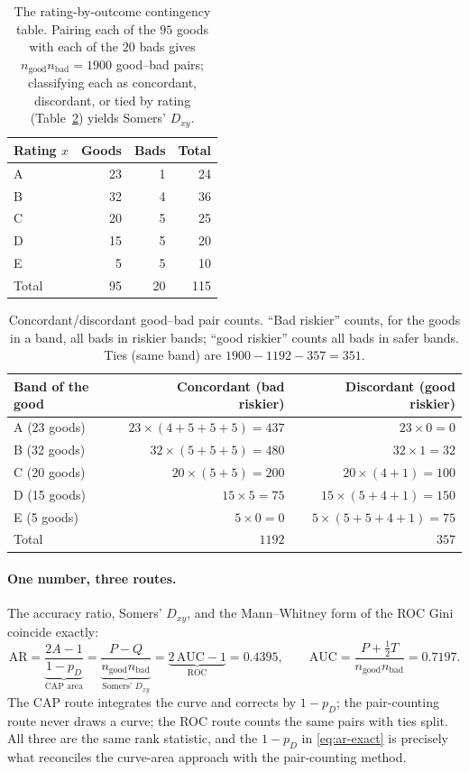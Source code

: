 \documentclass[12pt]{article}
\newcommand{\pD}{p_D}
\newcommand{\AR}{\mathrm{AR}}
\begin{document}
\begin{table}[htbp]
\centering
\small
\begin{tabular}{l r r r}
\toprule
Rating $x$ & Goods & Bads & Total \\
\midrule
A & 23 & 1 & 24 \\
B & 32 & 4 & 36 \\
C & 20 & 5 & 25 \\
D & 15 & 5 & 20 \\
E & 5 & 5 & 10 \\
\midrule
Total & 95 & 20 & 115 \\
\bottomrule
\end{tabular}
\caption{The rating-by-outcome contingency table. Pairing each of the $95$ goods with each of
the $20$ bads gives $n_{\text{good}}n_{\text{bad}}=1900$ good--bad pairs; classifying each as
concordant, discordant, or tied by rating (Table~\ref{tab:pairs}) yields Somers' $D_{xy}$.}
\label{tab:contingency}
\end{table}

\begin{table}[htbp]
\centering
\small
\begin{tabular}{l r r}
\toprule
Band of the good & Concordant (bad riskier) & Discordant (good riskier)\\
\midrule
A (23 goods) & $23\times(4{+}5{+}5{+}5)=437$ & $23\times 0 = 0$ \\
B (32 goods) & $32\times(5{+}5{+}5)=480$ & $32\times 1 = 32$ \\
C (20 goods) & $20\times(5{+}5)=200$ & $20\times(4{+}1)=100$ \\
D (15 goods) & $15\times 5 = 75$ & $15\times(5{+}4{+}1)=150$ \\
E (5 goods)  & $5\times 0 = 0$ & $5\times(5{+}5{+}4{+}1)=75$ \\
\midrule
Total & $1192$ & $357$ \\
\bottomrule
\end{tabular}
\caption{Concordant/discordant good--bad pair counts. ``Bad riskier'' counts, for the goods in
a band, all bads in riskier bands; ``good riskier'' counts all bads in safer bands. Ties (same
band) are $1900-1192-357=351$.}
\label{tab:pairs}
\end{table}

\paragraph{One number, three routes.} The accuracy ratio, Somers' $D_{xy}$, and the
Mann--Whitney form of the ROC Gini coincide exactly:
\begin{equation}\label{eq:three-routes}
\AR=\underbrace{\frac{2A-1}{1-\pD}}_{\text{CAP area}}
=\underbrace{\frac{P-Q}{n_{\text{good}}n_{\text{bad}}}}_{\text{Somers' }D_{xy}}
=\underbrace{2\,\mathrm{AUC}-1}_{\text{ROC}}
=0.4395,
\qquad
\mathrm{AUC}=\frac{P+\tfrac12 T}{n_{\text{good}}n_{\text{bad}}}=0.7197 .
\end{equation}
The CAP route integrates the curve and corrects by $1-\pD$; the pair-counting route never
draws a curve; the ROC route counts the same pairs with ties split. All three are the same
rank statistic, and the $1-\pD$ in \eqref{eq:ar-exact} is precisely what reconciles the
curve-area approach with the pair-counting method.
\end{document}
